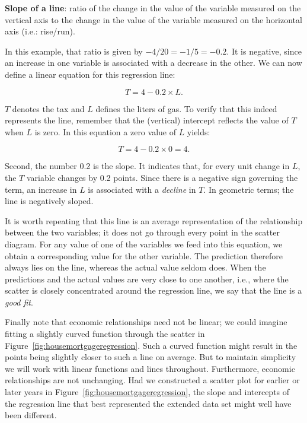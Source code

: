 \begin{DefBox}
\textbf{Slope of a line}: ratio of the change in the value of the variable measured on the vertical axis to the change in the value of the variable measured on the horizontal axis (i.e.: rise/run).
\end{DefBox}

In this example, that ratio is given by $-4/20=-1/5=-0.2$. It is negative, since an increase in one variable is associated with a decrease in the other. We can now define a linear equation for this regression line:

\begin{equation*}
T=4-0.2\times L.
\end{equation*}

$T$ denotes the tax and $L$ defines the liters of gas. To verify that this indeed represents the line, remember that the (vertical) intercept reflects the value of $T$ when $L$ is zero. In this equation a zero value of $L$ yields:

\begin{equation*}
T=4-0.2\times 0=4.
\end{equation*}

Second, the number 0.2 is the slope. It indicates that, for every unit change in $L$, the $T$ variable changes by 0.2 points. Since there is a negative sign governing the term, an increase in $L$ is associated with a \textit{decline} in $T$. In geometric terms; the line is negatively sloped.

It is worth repeating that this line is an average representation of the relationship between the two variables; it does not go through every point in the scatter diagram. For any value of one of the variables we feed into this equation, we obtain a corresponding value for the other variable. The prediction therefore always lies on the line, whereas the actual value seldom does. When the predictions and the actual values are very close to one another, i.e., where the scatter is closely concentrated around the regression line, we say that the line is a \textit{good fit}.

Finally note that economic relationships need not be linear; we could imagine fitting a slightly curved function through the scatter in Figure~\ref{fig:housemortgageregression}. Such a curved function might result in the points being slightly closer to such a line on average. But to maintain simplicity we will work with linear functions and lines throughout. Furthermore, economic relationships are not unchanging. Had we constructed a scatter plot for earlier or later years in Figure~\ref{fig:housemortgageregression}, the slope and intercepts of the regression line that best represented the extended data set might well have been different.